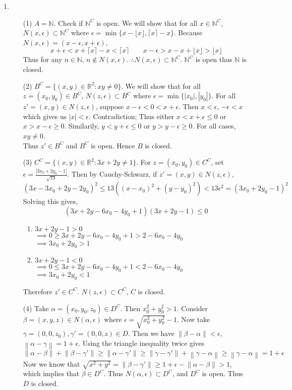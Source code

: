 \documentclass[12pt]{report}
\newcommand{\numl}[1]{\item[\large\textbf{\sffamily #1.}]}
\newcommand{\bb}[1]{\mathbb{#1}}
\newcommand{\norm}[1]{\left\lVert#1\right\rVert}
\newcommand{\abs}[1]{\left|#1\right|}
\newcommand{\ds}{\displaystyle}
\begin{document}
\begin{enumerate}
\numl{8} 
\begin{enumerate}
	\item[(1)] $A = \bb{N}$. Check if $\bb{N}^C$ is open. We will show that for all $x\in \bb{N}^C$, $N(x, \epsilon)\subset \bb{N}^C$ where $\epsilon = \min\{x - \lfloor x \rfloor, \lceil x\rceil - x  \}$. Because $N(x, \epsilon) = (x - \epsilon, x +\epsilon)$,
	$$x + \epsilon < x + \lceil x\rceil - x < \lceil x\rceil \qquad x - \epsilon > x-x + \lfloor x \rfloor>  \lfloor x \rfloor $$
	Thus for any $n\in \bb{N}$, $n\notin N(x, \epsilon)$. $\therefore N(x, \epsilon) \subset \bb{N}^C$. $\bb{N}^C$ is open thus $\bb{N}$ is closed.
	\item [(2)] $B^C = \{(x, y)\in \bb{R}^2: xy\neq 0 \}$. We will show that for all $z = (x_0, y_0)\in B^C$, $N(z, \epsilon) \subset B^C$ where $\epsilon = \min\{\abs{x_0}, \abs{y_0} \}$.
	For all $z'=(x, y)\in N(z, \epsilon)$, suppose $x-\epsilon < 0 < x+ \epsilon$. Then $x < \epsilon$, $-\epsilon < x$ which gives us $\abs{x}<\epsilon$. Contradiction; Thus either $x <x +\epsilon \leq 0$ or $x > x - \epsilon \geq 0$. Similarily, $y < y +\epsilon \leq 0$ or $y > y - \epsilon \geq 0$. For all cases, $xy \neq 0$.\\
	Thus $z'\in B^C$ and $B^C$ is open. Hence $B$ is closed.
	\item[(3)] $C^C = \{(x, y)\in \bb{R}^2: 3x+2y\neq 1 \}$. For $z = (x_0, y_0)\in C^C$, set $\epsilon = \ds\frac{\abs{3x_0 +2y_0-1}}{\sqrt{13}}$. Then by Cauchy-Schwarz, if $z'=(x, y)\in N(z, \epsilon)$, $$(3x-3x_0+2y-2y_0)^2 \leq 13\left((x-x_0)^2 + (y-y_0)^2\right) < 13\epsilon^2 = (3x_0+2y_0-1)^2$$
	Solving this gives, $$(3x+2y-6x_0-4y_0+1)(3x+2y-1)\leq 0$$
	\begin{enumerate}
		\item $3x+2y - 1 > 0$\\
		$\implies 0 \geq 3x+2y-6x_0-4y_0+1 > 2 - 6x_0-4y_0$\\
		$\implies 3x_0+2y_0>1$
		\item $3x+2y - 1<0$\\
		$\implies 0 \leq 3x+2y-6x_0-4y_0+1 < 2 - 6x_0-4y_0$\\
		$\implies 3x_0+2y_0 <1$	
	\end{enumerate}
	Therefore $z'\in C^C$. $N(z, \epsilon) \subset C^C$, $C$ is closed.
	\item[(4)] Take $\alpha = (x_0, y_0, z_0) \in D^C$. Then $x_0^2+y_0^2>1$. Consider $\beta = (x, y, z) \in N(\alpha, \epsilon)$ where $\epsilon = \sqrt{x_0^2+y_0^2} - 1$. Now take $\gamma = (0, 0, z_0), \gamma' = (0, 0, z) \in D$. Then we have $\norm{\beta-\alpha} <\epsilon$, $\norm{\alpha-\gamma} = 1 + \epsilon$. Using the triangle inequality twice gives $$\norm{\alpha-\beta} + \norm{\beta-\gamma'}\geq \norm{\alpha-\gamma'}\geq \norm{\gamma - \gamma'} + \norm{\gamma-\alpha} \geq \norm{\gamma-\alpha} = 1+\epsilon$$
	Now we know that $\sqrt{x^2+y^2} = \norm{\beta - \gamma'} \geq 1+\epsilon - \norm{\alpha-\beta} > 1$, which implies that $\beta \in D^C$. Thus $N(\alpha, \epsilon) \subset D^C$, and $D^C$ is open. Thus $D$ is closed.

\end{enumerate}


\end{enumerate}
\end{document}
